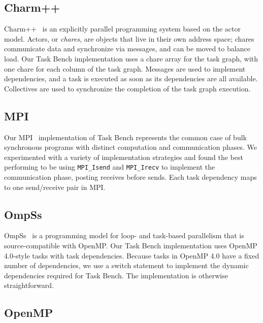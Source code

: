\subsection{Charm++}

Charm++~\cite{Charmpp93} is an explicitly parallel programming system
based on the actor model. Actors, or
\emph{chares}, are objects that live in their own address space;
chares communicate data and synchronize via messages, and can be moved
to balance load. Our Task Bench implementation uses a chare
array for the task graph, with one chare for each column of the task graph. Messages are
used to implement dependencies, and a task is executed as soon as its
dependencies are all available. Collectives are used to synchronize the
completion of the task graph execution.


\subsection{MPI}

Our MPI~\cite{MPI} implementation of Task Bench represents the common
case of bulk synchronous programs with distinct computation and
communication phases. We experimented with a variety of implementation
strategies and found the best performing to be using
\lstinline[language=C++]{MPI_Isend} and
\lstinline[language=C++]{MPI_Irecv} to implement the communication
phase, posting receives before sends. Each task dependency maps to one
send/receive pair in MPI.

\subsection{OmpSs}

OmpSs~\cite{OmpSs11} is a programming model for loop- and task-based parallelism
that is source-compatible with OpenMP. Our Task Bench implementation
uses OpenMP 4.0-style tasks with task dependencies. Because tasks in
OpenMP 4.0 have a fixed number of dependencies, we use a switch
statement to implement the dynamic dependencies required for Task
Bench. The implementation is otherwise straightforward.


\subsection{OpenMP}

